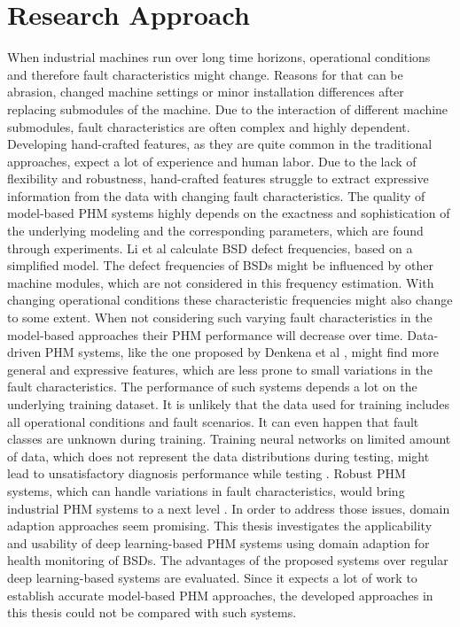 \chapter{Research Approach}\label{chapter:research_approach}

When industrial machines run over long time horizons, operational conditions and therefore fault characteristics might change. Reasons for that can be abrasion, changed machine settings or minor installation differences after replacing submodules of the machine. Due to the interaction of different machine submodules, fault characteristics are often complex and highly dependent. Developing hand-crafted features, as they are quite common in the traditional approaches, expect a lot of experience and human labor. Due to the lack of flexibility and robustness, hand-crafted features struggle to extract expressive information from the data with changing fault characteristics. The quality of model-based PHM systems highly depends on the exactness and sophistication of the underlying modeling and the corresponding parameters, which are found through experiments. Li et al calculate BSD defect frequencies, based on a simplified model. The defect frequencies of BSDs might be influenced by other machine modules, which are not considered in this frequency estimation. With changing operational conditions these characteristic frequencies might also change to some extent. When not considering such varying fault characteristics in the model-based approaches their PHM performance will decrease over time. Data-driven PHM systems, like the one proposed by Denkena et al \cite{Denkena2021}, might find more general and expressive features, which are less prone to small variations in the fault characteristics. The performance of such systems depends a lot on the underlying training dataset. It is unlikely that the data used for training includes all operational conditions and fault scenarios. It can even happen that fault classes are unknown during training. Training neural networks on limited amount of data, which does not represent the data distributions during testing, might lead to unsatisfactory diagnosis performance while testing \cite{AZAMFAR2020103932}. Robust PHM systems, which can handle variations in fault characteristics, would bring industrial PHM systems to a next level \cite{Michau2017}. In order to address those issues, domain adaption approaches seem promising. This thesis investigates the applicability and usability of deep learning-based PHM systems using domain adaption for health monitoring of BSDs. The advantages of the proposed systems over regular deep learning-based systems are evaluated. Since it expects a lot of work to establish accurate model-based PHM approaches, the developed approaches in this thesis could not be compared with such systems.

